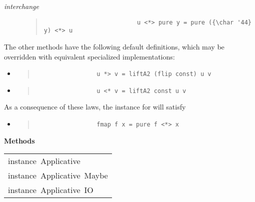 \begin{haddockdesc}
\begin{description}
\item[\emph{interchange}] \begin{quote}
                          {\haddockverb\begin{verbatim}
                          u <*> pure y = pure ({\char '44} y) <*> u\end{verbatim}}
                          \end{quote}
                          
\end{description}The other methods have the following default definitions, which may
 be overridden with equivalent specialized implementations:\par
                 \begin{itemize}
                 \item
                 \begin{quote}
                 {\haddockverb\begin{verbatim}
                 u *> v = liftA2 (flip const) u v\end{verbatim}}
                 \end{quote}
                 
                 \item
                 \begin{quote}
                 {\haddockverb\begin{verbatim}
                 u <* v = liftA2 const u v\end{verbatim}}
                 \end{quote}
                 
                 \end{itemize}
                 As a consequence of these laws, the  instance for  will satisfy\par
                 \begin{itemize}
                 \item
                 \begin{quote}
                 {\haddockverb\begin{verbatim}
                 fmap f x = pure f <*> x\end{verbatim}}
                 \end{quote}
                 
                 \end{itemize}
                 
\haddockpremethods{}\textbf{Methods}
\end{haddockdesc}
\begin{haddockdesc}
\item[\begin{tabular}{@{}l}
instance\ Applicative\ {\char 91}{\char 93}\\instance\ Applicative\ Maybe\\instance\ Applicative\ IO
\end{tabular}]
\end{haddockdesc}


